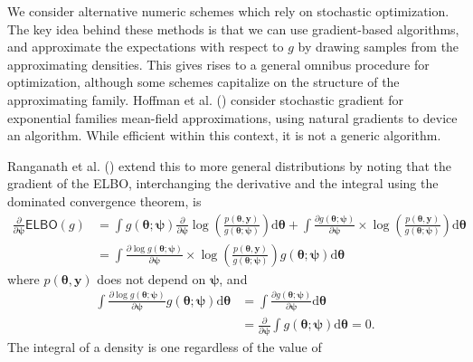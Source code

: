 \documentclass[
  11pt,
  letterpaper,
]{scrbook}
\theoremstyle{definition}
\theoremstyle{plain}
\theoremstyle{plain}
\theoremstyle{plain}
\theoremstyle{definition}
\theoremstyle{definition}
\theoremstyle{plain}
\theoremstyle{plain}
\theoremstyle{remark}
\begin{document}
We consider alternative numeric schemes which rely on stochastic
optimization. The key idea behind these methods is that we can use
gradient-based algorithms, and approximate the expectations with respect
to \(g\) by drawing samples from the approximating densities. This gives
rises to a general omnibus procedure for optimization, although some
schemes capitalize on the structure of the approximating family. Hoffman
et al. () consider stochastic gradient
for exponential families mean-field approximations, using natural
gradients to device an algorithm. While efficient within this context,
it is not a generic algorithm.

Ranganath et al. () extend this to
more general distributions by noting that the gradient of the ELBO,
interchanging the derivative and the integral using the dominated
convergence theorem, is \begin{align*}
\frac{\partial}{\partial \boldsymbol{\psi}} \mathsf{ELBO}(g) &= \int g(\boldsymbol{\theta}; \boldsymbol{\psi}) \frac{\partial}{\partial \boldsymbol{\psi}} \log \left( \frac{p(\boldsymbol{\theta}, \boldsymbol{y})}{g(\boldsymbol{\theta}; \boldsymbol{\psi})}\right) \mathrm{d} \boldsymbol{\theta} + \int  \frac{\partial g(\boldsymbol{\theta}; \boldsymbol{\psi})}{\partial \boldsymbol{\psi}} \times \log \left( \frac{p(\boldsymbol{\theta}, \boldsymbol{y})}{g(\boldsymbol{\theta}; \boldsymbol{\psi})}\right) \mathrm{d} \boldsymbol{\theta}
\\& = \int  \frac{\partial \log g(\boldsymbol{\theta}; \boldsymbol{\psi})}{\partial \boldsymbol{\psi}} \times \log \left( \frac{p(\boldsymbol{\theta}, \boldsymbol{y})}{g(\boldsymbol{\theta}; \boldsymbol{\psi})}\right) g(\boldsymbol{\theta}; \boldsymbol{\psi})\mathrm{d} \boldsymbol{\theta}
\end{align*} where \(p(\boldsymbol{\theta}, \boldsymbol{y})\) does not
depend on \(\boldsymbol{\psi}\), and \begin{align*}
\int \frac{\partial \log g(\boldsymbol{\theta}; \boldsymbol{\psi})}{\partial \boldsymbol{\psi}} g(\boldsymbol{\theta}; \boldsymbol{\psi}) \mathrm{d} \boldsymbol{\theta} & = \int \frac{\partial g(\boldsymbol{\theta}; \boldsymbol{\psi})}{\partial \boldsymbol{\psi}} \mathrm{d} \boldsymbol{\theta}  \\&=
\frac{\partial}{\partial \boldsymbol{\psi}}\int g(\boldsymbol{\theta}; \boldsymbol{\psi})  \mathrm{d} \boldsymbol{\theta} = 0.
\end{align*} The integral of a density is one regardless of the value of
\end{document}
